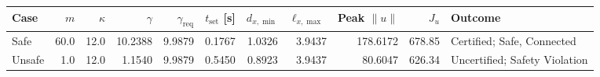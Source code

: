 \begin{tabular}{@{}lrrrrrrrrrl@{}}\toprule
Case & $m$ & $\kappa$ & $\gamma$ & $\gamma_{\mathrm{req}}$ & $t_{\mathrm{set}}$ [s] & $d_{x,\min}$ & $\ell_{x,\max}$ & Peak $\|u\|$ & $J_u$ & Outcome \\\midrule
Safe & 60.0 & 12.0 & 10.2388 & 9.9879 & 0.1767 & 1.0326 & 3.9437 & 178.6172 & 678.85 & Certified; Safe, Connected \\
Unsafe & 1.0 & 12.0 & 1.1540 & 9.9879 & 0.5450 & 0.8923 & 3.9437 & 80.6047 & 626.34 & Uncertified; Safety Violation \\
\bottomrule\end{tabular}
